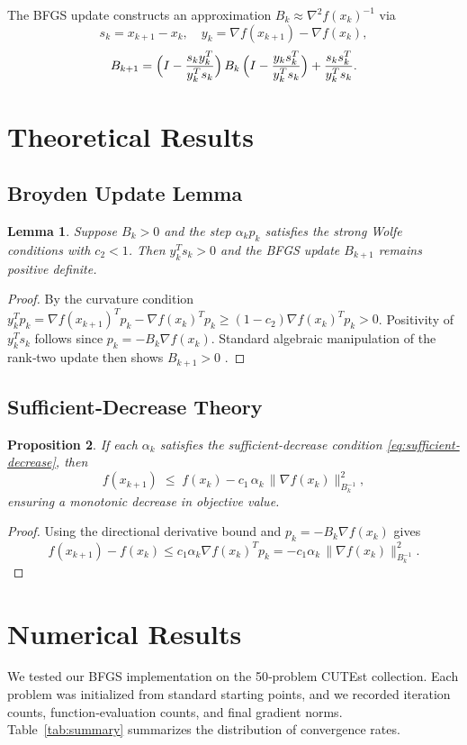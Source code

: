 \documentclass[12pt]{report}
\newtheorem{lemma}{Lemma}[section]
\newtheorem{proposition}[lemma]{Proposition}
\begin{document}
The BFGS update constructs an approximation $B_k \approx \nabla^2 f(x_k)^{-1}$ via
\[
	s_k = x_{k+1}-x_k,\quad y_k=\nabla f(x_{k+1})-\nabla f(x_k),
\]
\[
	B_{k+1} = \Bigl(I - \frac{s_k y_k^T}{y_k^T s_k}\Bigr)\,B_k\,
	\Bigl(I - \frac{y_k s_k^T}{y_k^T s_k}\Bigr) + \frac{s_k s_k^T}{y_k^T s_k}.
\]

\section{Theoretical Results}
\subsection{Broyden Update Lemma}
\begin{lemma}
	Suppose $B_k\!>\!0$ and the step $\alpha_k p_k$ satisfies the strong Wolfe conditions with $c_2<1$.  Then $y_k^Ts_k>0$ and the BFGS update $B_{k+1}$ remains positive definite.
\end{lemma}
\begin{proof}
	By the curvature condition $y_k^T p_k = \nabla f(x_{k+1})^T p_k - \nabla f(x_k)^T p_k \ge (1-c_2)\nabla f(x_k)^T p_k>0$.  Positivity of $y_k^Ts_k$ follows since $p_k=-B_k\nabla f(x_k)$.  Standard algebraic manipulation of the rank‐two update then shows $B_{k+1}>0$ .
\end{proof}

\subsection{Sufficient‐Decrease Theory}
\begin{proposition}
	If each $\alpha_k$ satisfies the sufficient‐decrease condition \eqref{eq:sufficient‐decrease}, then
	\[
		f(x_{k+1}) \;\le\; f(x_k) - c_1\,\alpha_k\,\|\nabla f(x_k)\|^2_{B_k^{-1}},
	\]
	ensuring a monotonic decrease in objective value.
\end{proposition}
\begin{proof}
	Using the directional derivative bound and $p_k=-B_k\nabla f(x_k)$ gives
	\[
		f(x_{k+1}) - f(x_k)
		\le c_1 \alpha_k \nabla f(x_k)^T p_k
		= -c_1 \alpha_k \,\|\nabla f(x_k)\|^2_{B_k^{-1}}.
	\]
\end{proof}

\section{Numerical Results}
We tested our BFGS implementation on the 50‐problem CUTEst collection.  Each problem was initialized from standard starting points, and we recorded iteration counts, function‐evaluation counts, and final gradient norms.  Table \ref{tab:summary} summarizes the distribution of convergence rates.
\end{document}

